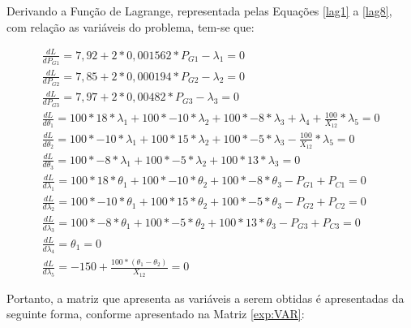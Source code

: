 		Derivando a Função de Lagrange, representada pelas Equações \ref{lag1} a \ref{lag8}, com relação as variáveis do problema, tem-se que: 
 	
		\begin{align}
			\frac{dL}{dP_{G1}} = 7,92 + 2*0,001562*P_{G1} - \lambda{_1} = 0
			\label{derlag1}\\
			\frac{dL}{dP_{G2}} = 7,85 + 2*0,000194*P_{G2} - \lambda{_2} = 0
			\label{derlag2}\\
			\frac{dL}{dP_{G3}} = 7,97 + 2*0,00482*P_{G3} - \lambda{_3} = 0
			\label{derlag3}\\
			\frac{dL}{d\theta{_1}} = 100*18*\lambda{_1} + 100*-10*\lambda{_2} + 100*-8*\lambda{_3} + \lambda{_4} + \frac{100}{X_{12}}*\lambda{_5} = 0
			\label{derlag4}\\
			\frac{dL}{d\theta{_2}} = 100*-10*\lambda{_1} + 100*15*\lambda{_2} + 100*-5*\lambda{_3} - \frac{100}{X_{12}}*\lambda{_5} = 0
			\label{derlag5}\\
			\frac{dL}{d\theta{_3}} = 100*-8*\lambda{_1} + 100*-5*\lambda{_2} + 100*13*\lambda{_3} = 0
			\label{derlag6}\\
			\frac{dL}{d\lambda{_1}} = 100*18*\theta{_1} + 100*-10*\theta{_2} + 100*-8*\theta{_3} - P_{G1} + P_{C1} = 0
			\label{derlag7}\\
			\frac{dL}{d\lambda{_2}} = 100*-10*\theta{_1} + 100*15*\theta{_2} + 100*-5*\theta{_3} - P_{G2} + P_{C2} = 0
			\label{derlag8}\\
			\frac{dL}{d\lambda{_3}} = 100*-8*\theta{_1} + 100*-5*\theta{_2} + 100*13*\theta{_3} - P_{G3} + P_{C3} = 0
			\label{derlag9}\\
			\frac{dL}{d\lambda{_4}} = \theta{_1} = 0
			\label{derlag10}\\
			\frac{dL}{d\lambda{_5}} = -150 + \frac{100*(\theta{_1} - \theta{_2})}{X_{12}} = 0
			\label{derlag11}
		\end{align}
		
		Portanto, a matriz que apresenta as variáveis a serem obtidas é apresentadas da seguinte forma, conforme apresentado na Matriz \ref{exp:VAR}:
		
